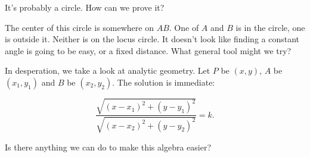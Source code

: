 









It's probably a circle. How can we prove it?

The center of this circle is somewhere on $AB.$  One of $A$ and $B$ is in the circle, one is outside it. Neither is on the locus circle. It doesn't look like finding a constant angle is going to be easy, or a fixed distance. What general tool might we try?


In desperation, we take a look at analytic geometry. Let $P$ be $(x,y)$, $A$ be $(x_1,y_1)$ and $B$ be $(x_2,y_2)$. The solution is immediate:

$$\frac{\sqrt{(x-x_1)^2 + (y-y_1)^2}}{\sqrt{(x-x_2)^2 + (y-y_2)^2}} = k.$$

Is there anything we can do to make this algebra easier?





